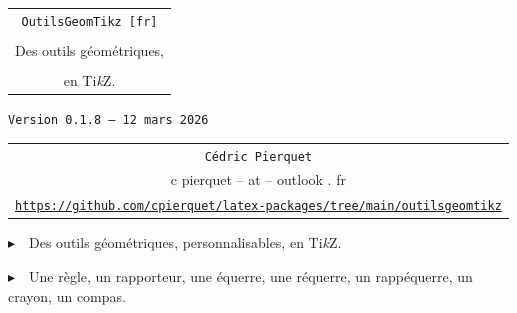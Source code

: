 \documentclass[french,a4paper,11pt]{article}
\def\TPversion{0.1.8}
\def\TPdate{12 mars 2026}
\begin{document}
\setlength{\aweboxleftmargin}{0.07\linewidth}
\setlength{\aweboxcontentwidth}{0.93\linewidth}
\setlength{\aweboxvskip}{8pt}

\thispagestyle{empty}

\vspace{2cm}

\begin{center}
	\begin{minipage}{0.75\linewidth}
	\begin{tcolorbox}[colframe=yellow,colback=yellow!15]
		\begin{center}
			\begin{tabular}{c}
				{\Huge \texttt{OutilsGeomTikz [fr]}}\\
				\\
				{\LARGE Des outils géométriques, } \\
				\\
				{\LARGE en Ti\textit{k}Z}. \\
			\end{tabular}
			
			\bigskip
			
			{\small \texttt{Version \TPversion{} -- \TPdate}}
		\end{center}
	\end{tcolorbox}
\end{minipage}
\end{center}

\begin{center}
	\begin{tabular}{c}
	\texttt{Cédric Pierquet}\\
	{\ttfamily c pierquet -- at -- outlook . fr}\\
	\texttt{\url{https://github.com/cpierquet/latex-packages/tree/main/outilsgeomtikz}}
\end{tabular}
\end{center}

\vspace{0.25cm}

{$\blacktriangleright$~~Des outils géométriques, personnalisables, en Ti\textit{k}Z.}

\smallskip

{$\blacktriangleright$~~Une règle, un rapporteur, une équerre, une réquerre, un rappéquerre, un crayon, un compas.}

\vspace{0.5cm}
\end{document}
